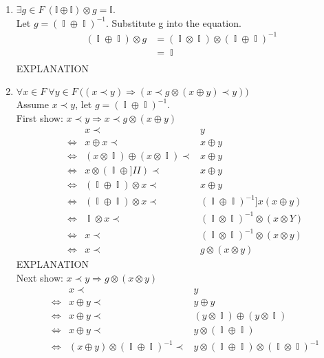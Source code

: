 \documentclass[11pt]{article}
\numberwithin{equation}{section}
\DeclareMathOperator*{\OO}{\mathbb{O}}
\DeclareMathOperator*{\II}{\mathbb{I}}
\DeclareMathOperator*{\+}{\oplus}
\DeclareMathOperator*{\x}{\otimes}
\DeclareMathOperator*{\fl}{\prec} %
\DeclareMathOperator*{\Lra}{\Leftrightarrow}
\begin{document}
\begin{enumerate}[label= 1.\arabic*, itemsep=0.2cm]
     \item %
       $\exists g \in F \ (\mathbb{I} \oplus \mathbb{I} ) \otimes g = \mathbb{I}$.\\
      Let $g = (\II \+ \II)^{-1}$. 
      Substitute g into the equation.
      \begin{align*}
        (\II \+ \II) \x g &= (\II \x \II ) \x (\II \+ \II)^{-1}\\%
                          &= \II \\%
      \end{align*}
      EXPLANATION      
     \item %
      $\forall x \in F \ \forall y \in F \ \Big ( (x \prec y) \Rightarrow (x \prec g \otimes ({x \oplus y}) \prec y) \Big )$\\
      Assume $x \fl y$, let $g = (\II \+ \II)^{-1}$.\\
      First show: $x \fl y \Rightarrow x \fl g \x (x \+ y )$
      \begin{align*}
        && x \fl& y \\
        &\Lra& x \+ x \fl& x \+ y \\ %
        &\Lra& (x \x \II ) \+ (x \x \II) \fl& x \+ y \\ %
        &\Lra& x \x (\II \+ ]II) \fl& x \+ y \\ %
        &\Lra& (\II \+ \II) \x x \fl& x \+ y \\ %
        &\Lra& (\II \+ \II) \x x \fl& (\II \+ \II)^{-1} ]x (x \+ y) \\ %
        &\Lra& \II \x x \fl& (\II \x \II)^{-1} \x (x \x Y) \\ %
        &\Lra& x \fl& (\II \x \II)^{-1} \x (x \x y) \\ %
        &\Lra& x \fl& g \x (x \x y) %
      \end{align*}
      EXPLANATION\\
Next show: $x \fl y \Rightarrow g \x (x \x y)$
\begin{align*}
  && x \fl& y \\
  &\Lra& x \+ y \fl& y \+ y \\ %
  &\Lra& x \+ y \fl& (y \x \II)\+ (y \x \II) \\ %
  &\Lra& x \+ y \fl& y \x (\II \+ \II) \\ %
  &\Lra& (x \+ y) \x (\II \+ \II)^{-1} \fl& y \x (\II \+ \II) \x (\II \x \II)^{-1} \\ %

\end{align*}
\end{enumerate}
\end{document}
